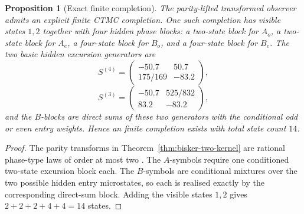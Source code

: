 \documentclass[11pt]{article}
\numberwithin{equation}{section}
\theoremstyle{thmcompact}
\newtheorem{proposition}[theorem]{Proposition}
\theoremstyle{remark}
\begin{document}
\begin{proposition}[Exact finite completion]\label{prop:bisker-finite-completion}
The parity-lifted transformed observer admits an explicit finite CTMC completion. One such completion has visible states $1,2$ together with four hidden phase blocks: a two-state block for $A_o$, a two-state block for $A_e$, a four-state block for $B_o$, and a four-state block for $B_e$. The two basic hidden excursion generators are
\begin{equation}\label{eq:bisker-S4}
S^{(4)}=
\begin{pmatrix}
-50.7 & 50.7\\
175/169 & -83.2
\end{pmatrix},
\end{equation}
\begin{equation}\label{eq:bisker-S3}
S^{(3)}=
\begin{pmatrix}
-50.7 & 525/832\\
83.2 & -83.2
\end{pmatrix},
\end{equation}
and the $B$-blocks are direct sums of these two generators with the conditional odd or even entry weights. Hence an finite completion exists with total state count $14$.
\end{proposition}

\begin{proof}
The parity transforms in Theorem~\ref{thm:bisker-two-kernel} are rational phase-type laws of order at most two \cite{Buchholz1994}. The $A$-symbols require one conditioned two-state excursion block each. The $B$-symbols are conditional mixtures over the two possible hidden entry microstates, so each is realised exactly by the corresponding direct-sum block. Adding the visible states $1,2$ gives $2+2+2+4+4=14$ states.
\end{proof}
\end{document}
